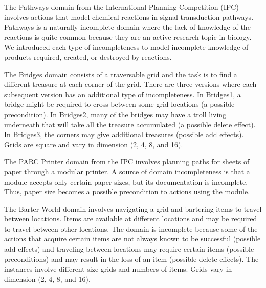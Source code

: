 \documentclass{article}
\def\citep#1{\cite{#1}}
\begin{document}
The Pathways domain from the International Planning Competition  (IPC) \citep{ipc} involves actions that model chemical reactions in signal transduction pathways.  Pathways is a naturally incomplete domain where the lack of knowledge of the reactions is quite common because they are an active research topic in biology.  We introduced each type of incompleteness to model incomplete knowledge of products required, created, or destroyed by reactions.

The Bridges domain consists of a traversable grid and the task is to find a different treasure at each corner of the grid. There are three versions where each subsequent version has an additional type of incompleteness.  In Bridges1, a bridge might be required  to cross between some grid locations (a possible precondition). In Bridges2, many of the bridges may have a troll living underneath that will take all the treasure accumulated (a possible delete effect). In Bridges3, the corners may give additional treasures (possible add effects).  Grids are square and vary in dimension (2, 4, 8, and 16).

The PARC Printer domain from the IPC involves planning paths for sheets of paper through a modular printer.  A source of domain incompleteness is that a module accepts only certain paper sizes, but its documentation is incomplete.  Thus, paper size becomes a possible precondition to actions using the module.  

The Barter World domain involves navigating a grid and bartering items to travel between locations.  Items are available at different locations and may be required to travel between other locations.  The domain is incomplete because some of the actions that acquire certain items are not always known to be successful (possible add effects) and traveling between locations may require certain items (possible preconditions) and may result in the loss of an item (possible delete effects).  The instances involve different size grids and numbers of items. Grids vary in dimension (2, 4, 8, and 16).


%
%
%
%
%
\end{document}
